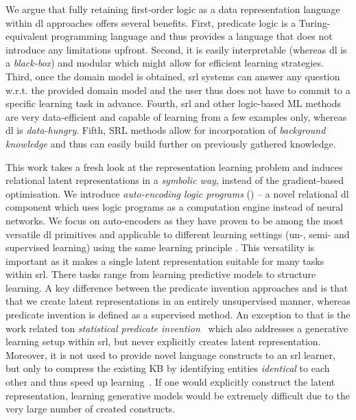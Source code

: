 We argue that fully retaining first-order logic as a data representation language within \gls{dl} approaches offers several benefits.
First, predicate logic is a Turing-equivalent programming language and thus provides a language that does not introduce any limitations upfront.
Second, it is easily interpretable (whereas \gls{dl} is a \textit{black-box}) and modular which might allow for efficient learning strategies.
Third, once the domain model is obtained, \gls{srl} systems can answer any question w.r.t. the provided domain model and the user thus does not have to commit to a specific learning task in advance.
Fourth, \gls{srl} and other logic-based ML methods are very data-efficient and capable of learning from a few examples only, whereas \gls{dl} is \textit{data-hungry}.
Fifth, SRL methods allow for incorporation of \textit{background knowledge} and thus can easily build further on previously gathered knowledge.






This work takes a fresh look at the representation learning problem and induces relational latent representations in a \textit{symbolic way}, instead of the gradient-based optimisation.
We introduce \textit{auto-encoding logic programs} () -- a novel relational \gls{dl} component which uses logic programs as a computation engine instead of neural networks.
We focus on auto-encoders as they have proven to be among the most versatile \gls{dl} primitives and applicable to different learning settings (un-, semi- and supervised learning) using the same learning principle \cite{SSLVAE2014,VincentDaE,Kingma2014,BengioSAE}.
This versatility is important as it makes a single latent representation suitable for many tasks within \gls{srl}.
There tasks range from learning predictive models to structure learning.
A key difference between the predicate invention approaches and  is that that we create latent representations in an entirely unsupervised manner, whereas predicate invention is defined as a supervised method.
An exception to that is the work related ton \textit{statistical predicate invention}~\cite{Kok2007} which also addresses a generative learning setup within \gls{srl}, but never explicitly creates latent representation.
Moreover, it is not used to provide novel language constructs to an \gls{srl} learner, but only to compress the existing KB by identifying entities \textit{identical} to each other and thus speed up learning~\cite{Kok:2009:LML:1553374.1553440}.
If one would explicitly construct the latent representation, learning generative models would be extremely difficult due to the very large number of created constructs.




